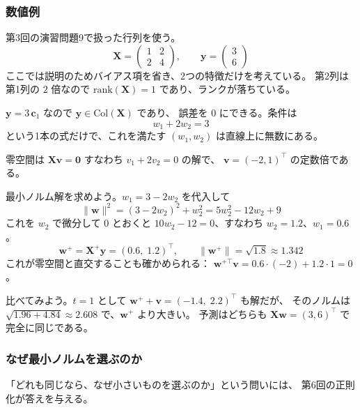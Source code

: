 \subsubsection{数値例}

第3回の演習問題9で扱った行列を使う。
\begin{equation*}
  \bm{X} = \begin{pmatrix} 1 & 2 \\ 2 & 4 \end{pmatrix}, \qquad
  \bm{y} = \begin{pmatrix} 3 \\ 6 \end{pmatrix}
\end{equation*}
ここでは説明のためバイアス項を省き、2つの特徴だけを考えている。
第2列は第1列の $2$ 倍なので $\mathrm{rank}(\bm{X}) = 1$ であり、ランクが落ちている。

$\bm{y} = 3\,\bm{c}_1$ なので $\bm{y} \in \mathrm{Col}(\bm{X})$ であり、
誤差を $0$ にできる。条件は
\begin{equation*}
  w_1 + 2w_2 = 3
\end{equation*}
という1本の式だけで、これを満たす $(w_1, w_2)$ は直線上に無数にある。

零空間は $\bm{X}\bm{v} = \bm{0}$ すなわち $v_1 + 2v_2 = 0$ の解で、
$\bm{v} = (-2, 1)^\top$ の定数倍である。

最小ノルム解を求めよう。$w_1 = 3 - 2w_2$ を代入して
\begin{equation*}
  \|\bm{w}\|^2 = (3 - 2w_2)^2 + w_2^2 = 5w_2^2 - 12w_2 + 9
\end{equation*}
これを $w_2$ で微分して $0$ とおくと $10w_2 - 12 = 0$、すなわち $w_2 = 1.2$、$w_1 = 0.6$。
\begin{equation*}
  \bm{w}^{+} = \bm{X}^{+}\bm{y} = (0.6,\; 1.2)^\top, \qquad \|\bm{w}^{+}\| = \sqrt{1.8} \approx 1.342
\end{equation*}
これが零空間と直交することも確かめられる：
$\bm{w}^{+\top}\bm{v} = 0.6 \cdot (-2) + 1.2 \cdot 1 = 0$。

比べてみよう。$t = 1$ として $\bm{w}^{+} + \bm{v} = (-1.4,\; 2.2)^\top$ も解だが、
そのノルムは $\sqrt{1.96 + 4.84} \approx 2.608$ で、$\bm{w}^{+}$ より大きい。
予測はどちらも $\bm{X}\bm{w} = (3, 6)^\top$ で完全に同じである。

\subsubsection{なぜ最小ノルムを選ぶのか}

「どれも同じなら、なぜ小さいものを選ぶのか」という問いには、
第6回の正則化が答えを与える。

